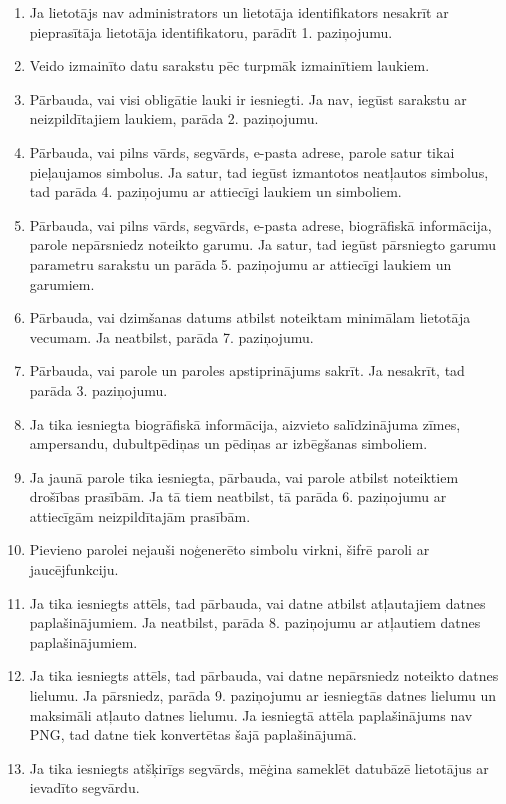 {
	\begin{enumerate}
		\item Ja lietotājs nav administrators un lietotāja identifikators nesakrīt ar pieprasītāja lietotāja identifikatoru, parādīt 1. paziņojumu.
		\item Veido izmainīto datu sarakstu pēc turpmāk izmainītiem laukiem.
		\item Pārbauda, vai visi obligātie lauki ir iesniegti.
		      Ja nav, iegūst sarakstu ar neizpildītajiem laukiem, parāda 2. paziņojumu.
		\item Pārbauda, vai pilns vārds, segvārds, e-pasta adrese, parole satur tikai pieļaujamos simbolus.
		      Ja satur, tad iegūst izmantotos neatļautos simbolus, tad parāda 4. paziņojumu ar attiecīgi laukiem un simboliem.
		\item Pārbauda, vai pilns vārds, segvārds, e-pasta adrese, biogrāfiskā informācija, parole nepārsniedz noteikto garumu.
		      Ja satur, tad iegūst pārsniegto garumu parametru sarakstu un parāda 5. paziņojumu ar attiecīgi laukiem un garumiem.
		\item Pārbauda, vai dzimšanas datums atbilst noteiktam minimālam lietotāja vecumam.
		      Ja neatbilst, parāda 7. paziņojumu.
		\item Pārbauda, vai parole un paroles apstiprinājums sakrīt.
		      Ja nesakrīt, tad parāda 3. paziņojumu.
		\item Ja tika iesniegta biogrāfiskā informācija, aizvieto salīdzinājuma zīmes, ampersandu, dubultpēdiņas un pēdiņas ar izbēgšanas simboliem.
		\item Ja jaunā parole tika iesniegta, pārbauda, vai parole atbilst noteiktiem drošības prasībām.
		      Ja tā tiem neatbilst, tā parāda 6. paziņojumu ar attiecīgām neizpildītajām prasībām.
		\item Pievieno parolei nejauši noģenerēto simbolu virkni, šifrē paroli ar jaucējfunkciju.
		\item Ja tika iesniegts attēls, tad pārbauda, vai datne atbilst atļautajiem datnes paplašinājumiem.
		      Ja neatbilst, parāda 8. paziņojumu ar atļautiem datnes paplašinājumiem.
		\item Ja tika iesniegts attēls, tad pārbauda, vai datne nepārsniedz noteikto datnes lielumu.
		      Ja pārsniedz, parāda 9. paziņojumu ar iesniegtās datnes lielumu un maksimāli atļauto datnes lielumu.
		      Ja iesniegtā attēla paplašinājums nav PNG, tad datne tiek konvertētas šajā paplašinājumā.
		\item Ja tika iesniegts atšķirīgs segvārds, mēģina sameklēt datubāzē lietotājus ar ievadīto segvārdu.

\end{enumerate}}
